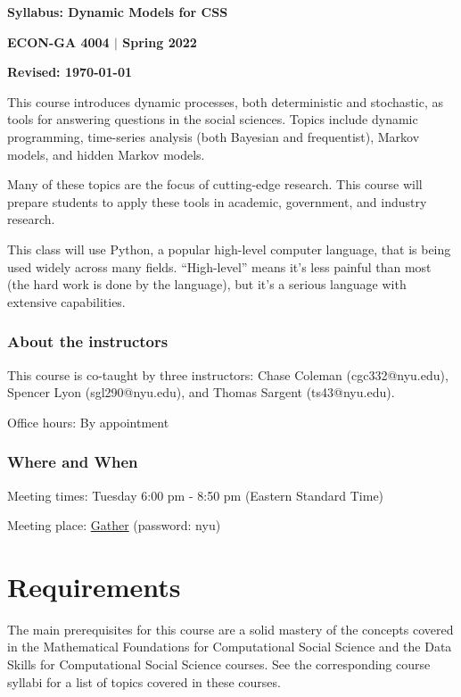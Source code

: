 \documentclass[12pt,pdftex,twoside,letterpaper]{exam}
\begin{document}
  \centerline{\Large\bf Syllabus: Dynamic Models for CSS}
  \vspace{3mm}
  \centerline{\large\bf ECON-GA 4004 $|$ Spring 2022}
  \vspace{3mm}
  \centerline{\bf Revised: \today}

  \bigskip

  This course introduces dynamic processes, both deterministic and stochastic, as tools for
  answering questions in the social sciences. Topics include dynamic programming, time-series
  analysis (both Bayesian and frequentist), Markov models, and hidden Markov models.

  Many of these topics are the focus of cutting-edge research. This course will prepare students to
  apply these tools in academic, government, and industry research.

  This class will use Python, a popular high-level computer language, that is being used widely
  across many fields. ``High-level'' means it's less painful than most (the hard work is done by
  the language), but it's a serious language with extensive capabilities.

  \subsubsection*{About the instructors}

    This course is co-taught by three instructors: Chase Coleman (cgc332@nyu.edu), Spencer Lyon
    (sgl290@nyu.edu), and Thomas Sargent (ts43@nyu.edu).

    Office hours: By appointment

  \subsubsection*{Where and When}

    Meeting times: Tuesday 6:00 pm - 8:50 pm (Eastern Standard Time)

    Meeting place: \href{https://gather.town/app/WswmVSire5wfEth0/ECON-GA-4004}{Gather} (password: nyu)

  \section*{Requirements}

    The main prerequisites for this course are a solid mastery of the concepts covered in the
    Mathematical Foundations for Computational Social Science and the Data Skills for Computational
    Social Science courses. See the corresponding course syllabi for a list of topics covered in
    these courses.
\end{document}
